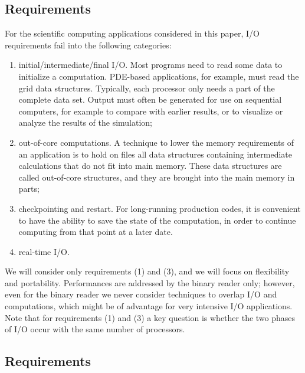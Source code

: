 \documentclass[11pt,relax]{SANDreport}
\begin{document}
\subsection{Requirements}

For the scientific computing applications considered in this paper, I/O
requirements fail into the following categories:
\begin{enumerate}
\item initial/intermediate/final I/O. Most programs need to read some data to
initialize a computation. PDE-based applications, for example, must read the
grid data structures. Typically, each processor only needs a part of the
complete data set. Output must often be generated for use on sequential
computers, for example to compare with earlier results, or to visualize or
analyze the results of the simulation;
\item out-of-core computations. A technique to lower the memory requirements
of an application is to hold on files all data structures containing
intermediate calculations that do not fit into main memory. These data
structures are called out-of-core structures, and they are brought into the
main memory in parts; 
\item checkpointing and restart. For long-running production codes, it is
convenient to have the ability to save the state of the computation, in order
to continue computing from that point at a later date. 
\item real-time I/O.
\end{enumerate}
We will consider only requirements (1) and (3), and we will focus on
flexibility and portability. Performances are addressed by the binary reader
only; however, even for the binary reader we never consider techniques to
overlap I/O and computations, which
might be of advantage for very intensive I/O applications. Note that for
requirements (1) and (3) a key question is whether the two phases of I/O occur
with the same number of processors. 

\subsection{Requirements}
\end{document}
